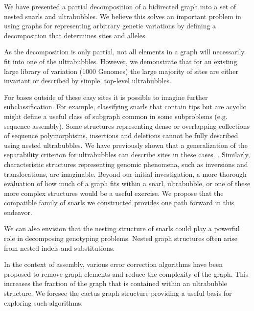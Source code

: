 \documentclass[11pt]{ucthesis}
\begin{document}
We have presented a partial decomposition of a bidirected graph into a set of nested snarls and ultrabubbles. We believe this solves an important problem in using graphs for representing arbitrary genetic variations by defining a decomposition that determines sites and alleles. 

As the decomposition is only partial, not all elements in a graph will necessarily fit into one of the ultrabubbles. However, we demonstrate that for an existing large library of variation (1000 Genomes) the large majority of sites are either invariant or described by simple, top-level ultrabubbles. 

For bases outside of these easy sites it is possible to imagine further subclassification. For example, classifying snarls that contain tips but are acyclic might define a useful class of subgraph common in some subproblems (e.g. sequence assembly). Some structures representing dense or overlapping collections of sequence polymorphisms, insertions and deletions cannot be fully described using nested ultrabubbles. We have previously shown that a generalization of the separability criterion for ultrabubbles can describe sites in these cases. \cite{Rosen2017}. Similarly, characteristic structures representing genomic phenomena, such as inversions and translocations, are imaginable. Beyond our initial investigation, a more thorough evaluation of how much of a graph fits within a snarl, ultrabubble, or one of these more complex structures would be a useful exercise. We propose that the compatible family of snarls we constructed provides one path forward in this endeavor.


We can also envision that the nesting structure of snarls could play a powerful role in decomposing genotyping problems. Nested graph structures often arise from nested indels and substitutions. 


In the context of assembly, various error correction algorithms have been proposed to remove graph elements and reduce the complexity of the graph. This increases the fraction of the graph that is contained within an ultrabubble structure. We foresee the cactus graph structure providing a useful basis for exploring such algorithms. 
\end{document}
